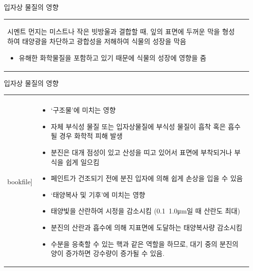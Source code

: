 \begin{frame}[t]{입자상 물질의 영향}
\begin{tabular}{ll}
\begin{minipage}[t]{0.55\textwidth}
		시멘트 먼지는 미스트나 작은 빗방울과 결합할 때, 잎의 표면에 두꺼운 막을 형성하여 태양광을 차단하고 광합성을 저해하여 식물의 성장을 막음
			\begin{itemize}			
				\item 유해한 화학물질을 포함하고 있기 때문에 식물의 성장에 영향을 줌
			\end{itemize}
		\end{minipage}
	\end{tabular}
\end{frame}



\begin{frame}[t]{입자상 물질의 영향}
	\begin{tabular}{ll}
		\begin{minipage}[t]{0.3\textwidth}\scriptsize
			\begin{figure}[t]
				\texttt{[image: \\bookfile]}
			\end{figure}
		\end{minipage}	
		&
		\begin{minipage}[t]{0.65\textwidth} \scriptsize	
			\begin{itemize}
				\item ‘구조물’에 미치는 영향
				\item 자체 부식성 물질 또는 입자상물질에 부식성 물질이 흡착 혹은 흡수될 경우 화학적 피해 발생 
				\item 분진은 대개 점성이 있고 산성을 띠고 있어서 표면에 부착되거나 부식을 쉽게 일으킴
				\item 페인트가 건조되기 전에 분진 입자에 의해 쉽게 손상을 입을 수 있음
				
				\item ‘태양복사 및 기후’에 미치는 영향
				\item 태양빛을 산란하여 시정을 감소시킴 (0.1~1.0μm일 때 산란도 최대)
				\item 분진의 산란과 흡수에 의해 지표면에 도달하는 태양복사량 감소시킴
				\item 수분을 응축할 수 있는 핵과 같은 역할을 하므로, 대기 중의 분진의 양이 증가하면 강수량이 증가될 수 있음.
				
			\end{itemize}

		\end{minipage}
	\end{tabular}
\end{frame}



